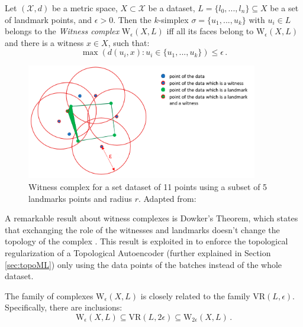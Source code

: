 \documentclass[../main.tex]{subfiles}
\begin{document}
\begin{definition}
Let $(\mathcal{X}, d)$ be a metric space, $X \subset \mathcal{X}$ be a dataset, $L = \{l_0, ..., l_n\} \subseteq X$ be a set of landmark points, and $\epsilon>0$. Then the $k$-simplex $\sigma = \{u_1, ..., u_k\}$ with $u_i \in L$ belongs to the \emph{Witness complex} $\text{W}_\epsilon(X, L)$ iff all its faces belong to $\text{W}_\epsilon(X, L)$ and there is a witness $x \in X$, such that:
\[
\max(d(u_i, x) : u_i \in \{u_1, ..., u_k\}) \leq \epsilon\,.
\]
\end{definition}


\begin{figure}[!ht]
\centering
\includegraphics[width=0.9\textwidth]{figures/bg/witnessCons.png} 
    \caption{Witness complex for a set  dataset of 11 points using a subset of 5 landmarks points and radius $r$. Adapted from: \cite{medbouhi_towards_2022}}
\label{fig:witnessCons}
\end{figure}


A remarkable result about witness complexes is Dowker's Theorem, which states that exchanging the role of the witnesses and landmarks doesn't change the topology of the complex \cite{dowker_homology_1952}. This result is exploited in \cite{schonenberger_witness_2022} to enforce the topological regularization of a Topological Autoencoder (further explained in Section \ref{sec:topoML}) only using the data points of the batches instead of the whole dataset.

\begin{proposition}
The family of complexes $\text{W}_\epsilon(X, L)$ is closely related to the family $\text{VR}(L, \epsilon)$. Specifically, there are inclusions:
\[
\text{W}_\epsilon(X, L) \subseteq \text{VR}(L, 2\epsilon) \subseteq \text{W}_{2\epsilon}(X, L)\,.
\]
\end{proposition}
\end{document}
